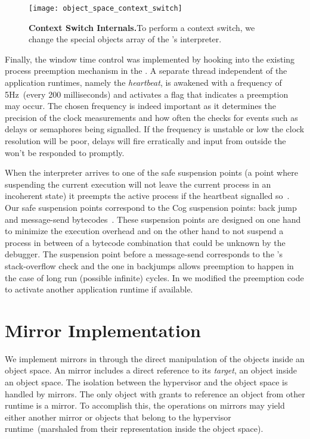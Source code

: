 \begin{figure}[ht]
\begin{center}
\texttt{[image: object\_space\_context\_switch]}
\caption{\textbf{Context Switch Internals.}To perform a context switch, we change the special objects array of the \VM's interpreter.\label{fig:context_switch}}
\end{center}
\end{figure}

Finally, the window time control was implemented by hooking into the existing process preemption mechanism in the \VM. A separate \VM thread independent of the application runtimes, namely the \emph{heartbeat}, is awakened with a frequency of 5Hz~(\ie every 200 milliseconds) and activates a flag that indicates a preemption may occur. The chosen frequency is indeed important as it determines the precision of the clock measurements and how often the \VM checks for events such as delays or semaphores being signalled. If the frequency is unstable or low the clock resolution will be poor, delays will fire erratically and input from outside the \VM won't be responded to promptly.

When the \VM interpreter arrives to one of the safe suspension points (\ie a point where suspending the current execution will not leave the current process in an incoherent state) it preempts the active process if the heartbeat signalled so~\cite{Deut84a}. Our safe suspension points correspond to the Cog \VM suspension points: back jump and message-send bytecodes~\cite{Mira11a}. These suspension points are designed on one hand to minimize the execution overhead and on the other hand to not suspend a process in between of a bytecode combination that could be unknown by the debugger. The suspension point before a message-send corresponds to the \VM's stack-overflow check and the one in backjumps allows preemption to happen in the case of long run (possible infinite) cycles. In \Vtt we modified the preemption code to activate another application runtime if available.

\section{\Vtt Mirror Implementation}\label{sec:implementation_mirrors}

We implement mirrors in \Vtt through the direct manipulation of the objects inside an object space. An \Vtt mirror includes a direct reference to its \emph{target}, an object inside an object space. The isolation between the hypervisor and the object space is handled by mirrors. The only object with grants to reference an object from other runtime is a mirror. To accomplish this, the operations on mirrors may yield either another mirror or objects that belong to the hypervisor runtime~(marshaled from their representation inside the object space).

